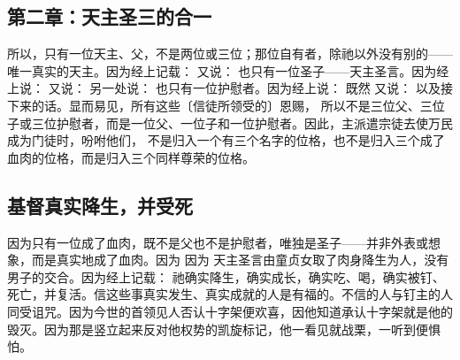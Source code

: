 
\subsection{第二章：天主圣三的合一}

所以，只有一位天主、父，不是两位或三位；那位自有者，除祂以外没有别的——唯一真实的天主。因为经上记载： 又说： 也只有一位圣子——天主圣言。因为经上说： 又说： 另一处说： 也只有一位护慰者。因为经上说： 既然 又说： 以及接下来的话。显而易见，所有这些〔信徒所领受的〕恩赐， 所以不是三位父、三位子或三位护慰者，而是一位父、一位子和一位护慰者。因此，主派遣宗徒去使万民成为门徒时，吩咐他们， 不是归入一个有三个名字的位格，也不是归入三个成了血肉的位格，而是归入三个同样尊荣的位格。\par


\subsection{基督真实降生，并受死}

因为只有一位成了血肉，既不是父也不是护慰者，唯独是圣子——并非外表或想象，而是真实地成了血肉。因为 因为 天主圣言由童贞女取了肉身降生为人，没有男子的交合。因为经上记载： 祂确实降生，确实成长，确实吃、喝，确实被钉、死亡，并复活。信这些事真实发生、真实成就的人是有福的。不信的人与钉主的人同受诅咒。因为今世的首领见人否认十字架便欢喜，因他知道承认十字架就是他的毁灭。因为那是竖立起来反对他权势的凯旋标记，他一看见就战栗，一听到便惧怕。\par


